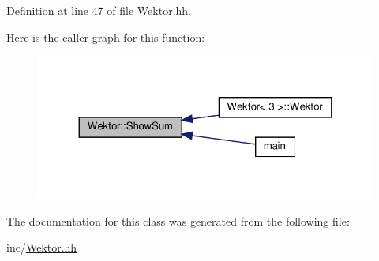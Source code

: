 Definition at line 47 of file Wektor.\+hh.

Here is the caller graph for this function\+:
\nopagebreak
\begin{figure}[H]
\begin{center}
\leavevmode
\includegraphics[width=324pt]{class_wektor_a5365d8d93dfaa304c7fbd998e92660b7_icgraph}
\end{center}
\end{figure}


The documentation for this class was generated from the following file\+:\begin{DoxyCompactItemize}
\item 
inc/\hyperlink{_wektor_8hh}{Wektor.\+hh}\end{DoxyCompactItemize}
